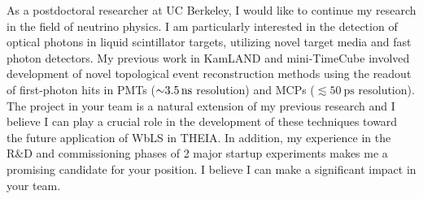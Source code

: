 \documentclass[10pt]{article} %
\begin{document}

As a postdoctoral researcher at UC Berkeley, I would like to continue my
research in the field of neutrino physics. I am particularly interested in the
detection of optical photons in liquid scintillator targets, utilizing novel
target media and fast photon detectors. My previous work in KamLAND and
mini-TimeCube involved development of novel topological event reconstruction
methods using the readout of first-photon hits in PMTs ($\SI{\sim
3.5}{\nano\second}$ resolution) and MCPs ($\lesssim \SI{50}{\pico\second}$
resolution). The project in your team is a natural extension of my previous
research and I believe I can play a crucial role in the development of these
techniques toward the future application of WbLS in THEIA. In addition, my
experience in the R\&D and commissioning phases of 2 major startup experiments
makes me a promising candidate for your position. I believe I can make a
significant impact in your team.
\end{document}
